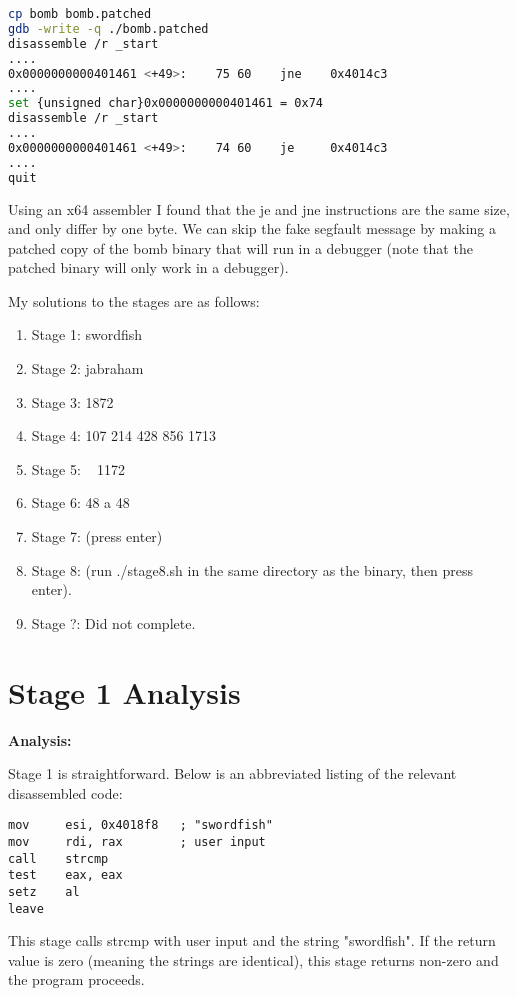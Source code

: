 \documentclass{article}
\begin{document}
\begin{lstlisting}[language=bash]
cp bomb bomb.patched
gdb -write -q ./bomb.patched
disassemble /r _start
....
0x0000000000401461 <+49>:    75 60    jne    0x4014c3
....
set {unsigned char}0x0000000000401461 = 0x74
disassemble /r _start
....
0x0000000000401461 <+49>:    74 60    je     0x4014c3
....
quit
\end{lstlisting}

\par
Using an x64 assembler I found that the je and jne instructions are the same
size, and only differ by one byte.  We can skip the fake segfault message by
making a patched copy of the bomb binary that will run in a debugger (note 
that the patched binary will only work in a debugger).

\par
My solutions to the stages are as follows:

\begin{enumerate}
  \item Stage 1: swordfish
  \item Stage 2: jabraham
  \item Stage 3: 1872
  \item Stage 4: 107 214 428 856 1713
  \item Stage 5: ~ 1172 ~
  \item Stage 6: 48 a 48
  \item Stage 7: (press enter)
  \item Stage 8: (run ./stage8.sh in the same directory as the binary, then 
  press enter).
  \item Stage ?: Did not complete.
\end{enumerate}

\newpage
\section{Stage 1 Analysis}
\begin{flushleft}
\vspace{.5pc}
\end{flushleft}

\begin{flushleft}
\textbf{Analysis:}
\vspace{.5pc}
\end{flushleft}

\par
Stage 1 is straightforward.  Below is an abbreviated listing of the relevant
disassembled code:
\begin{lstlisting}
mov     esi, 0x4018f8   ; "swordfish"
mov     rdi, rax        ; user input
call    strcmp
test    eax, eax
setz    al
leave
\end{lstlisting}
\par
This stage calls strcmp with user input and the string "swordfish".  If the 
return value is zero (meaning the strings are identical), this stage returns 
non-zero and the program proceeds.
\end{document}
